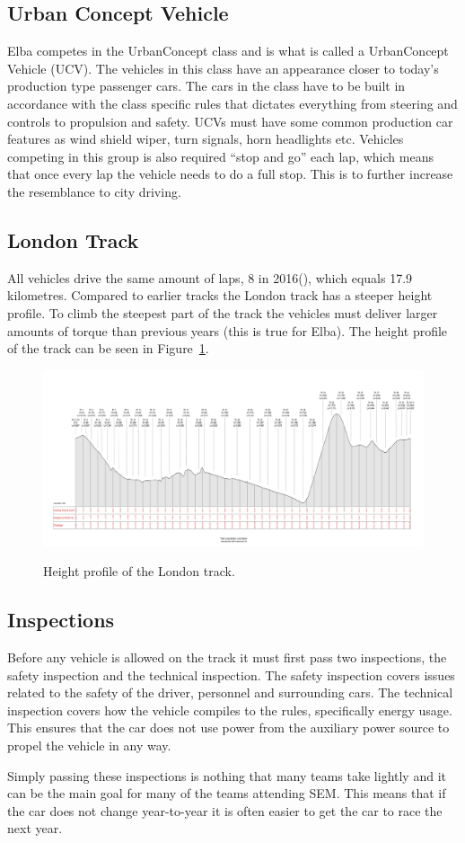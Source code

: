 \subsection{Urban Concept Vehicle}\label{UCV}
Elba competes in the UrbanConcept class and is what is called a UrbanConcept
Vehicle (UCV). The vehicles in this class have an appearance closer to today's
production type passenger cars. The cars in the class have to be built in
accordance with the class specific rules that dictates everything from steering
and controls to propulsion and safety. UCVs must have some common production
car features as wind shield wiper, turn signals, horn headlights etc. Vehicles
competing in this group is also required ``stop and go'' each lap, which means
that once every lap the vehicle needs to do a full stop. This is to further
increase the resemblance to city driving.

\subsection{London Track}
All vehicles drive the same amount of laps, 8 in 2016(\cite{semrules16c2}),
which equals 17.9 kilometres. Compared to earlier tracks the London track has a
steeper height profile. To climb the steepest part of the track the vehicles
must deliver larger amounts of torque than previous years (this is true for
Elba). The height profile of the track can be seen in
Figure~\ref{fig:introduction_londontrack}.
\begin{figure}[H]
    \centering\label{fig:introduction_londontrack}
    \includegraphics[width=\textwidth]{./img/introduction_londontrack.png}
    \caption{Height profile of the London track.}
\end{figure}

\subsection{Inspections}
Before any vehicle is allowed on the track it must first pass two inspections,
the safety inspection and the technical inspection. The safety inspection covers
issues related to the safety of the driver, personnel and surrounding cars. 
The technical inspection covers how the vehicle compiles to the rules,
specifically energy usage. This ensures that the car does not use power from the
auxiliary power source to propel the vehicle in any way.

Simply passing these inspections is nothing that many teams take lightly and it
can be the main goal for many of the teams attending SEM\@. This means that
if the car does not change year-to-year it is often easier to get the car to
race the next year.
